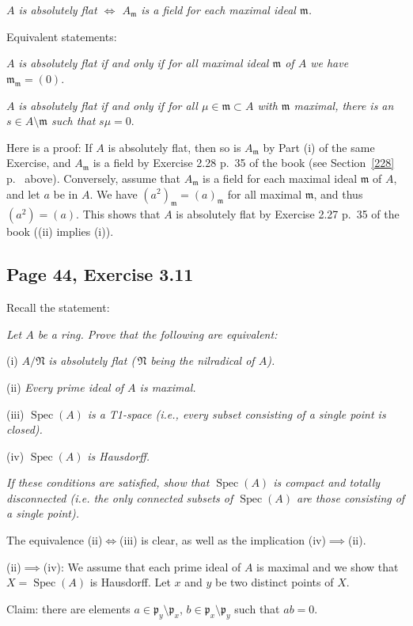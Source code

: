 \documentclass[parskip=half,fontsize=12pt]{scrartcl}%
\newcommand{\oo}{\operatorname}\newcommand{\ooo}{\operatorname*}
\newcommand{\mf}{\mathfrak}
\newcommand{\mmm}{\mf m}
\newcommand{\ppp}{\mf p}
\newcommand{\Spec}{\operatorname{Spec}}\newcommand{\Sp}{\operatorname{Spec}}
\begin{document}
\emph{$A$ is absolutely flat $\iff$ $A_\mmm$ is a field for each maximal ideal $\mmm$.}

Equivalent statements: 

$A$ \emph{is absolutely flat if and only if for all maximal ideal $\mf m$ of $A$ we have} $\mf m_{\mf m}=(0)$.

$A$ \emph{is absolutely flat if and only if for all $\mu\in\mf m\subset A$ with $\mf m$ maximal, there is an $s\in A\setminus\mf m$ such that} $s\mu=0$.

Here is a proof: If $A$ is absolutely flat, then so is $A_{\mf m}$ by Part (i) of the same Exercise, and $A_{\mf m}$ is a field by Exercise 2.28 p.~35 of the book (see Section~\ref{228} p.~\pageref{228} above). Conversely, assume that $A_{\mf m}$ is a field for each maximal ideal $\mf m$ of $A$, and let $a$ be in $A$. We have $(a^2)_{\mf m}=(a)_{\mf m}$ for all maximal $\mf m$, and thus $(a^2)=(a)$. This shows that $A$ is absolutely flat by Exercise 2.27 p.~35 of the book ((ii) implies (i)).

\subsection{Page 44, Exercise 3.11}%

Recall the statement:

\emph{Let $A$ be a ring. Prove that the following are equivalent:}

(i) $A/\mf N$ \emph{is absolutely flat ($\,\mf N$ being the nilradical of $A$).}

(ii) \emph{Every prime ideal of $A$ is maximal.}

(iii)  $\Spec(A)$ \emph{is a T1-space (i.e., every subset consisting of a single point is closed).}

(iv) $\Spec(A)$ \emph{is Hausdorff.}

\emph{If these conditions are satisfied, show that $\Spec(A)$ is compact and totally disconnected (i.e. the only connected subsets of $\Spec(A)$ are those consisting of a single point).}

The equivalence (ii)$\iff$(iii) is clear, as well as the implication (iv)$\implies$(ii).

(ii)$\implies$(iv): We assume that each prime ideal of $A$ is maximal and we show that $X=\oo{Spec}(A)$ is Hausdorff. Let $x$ and $y$ be two distinct points of $X$. 

Claim: %
there are elements $a\in\ppp_y\setminus\ppp_x$, $b\in\ppp_x\setminus\ppp_y$ such that $ab=0$.
\end{document}
